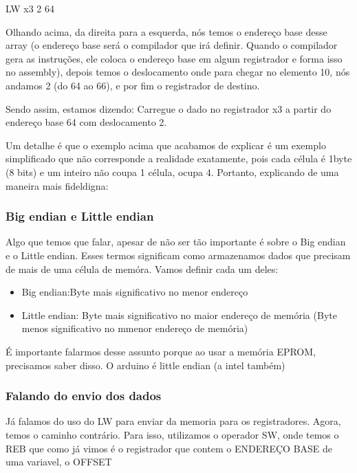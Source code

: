 \documentclass[12pt,a4paper]{report}
\begin{document}
	\begin{center}
		\begin{LARGE}
			LW x3 2 64
		\end{LARGE}
	\end{center}
	
	Olhando acima, da direita para a esquerda, nós temos o endereço base desse array (o endereço base será o compilador que irá definir. Quando o compilador gera as instruções, ele coloca o endereço base em algum registrador e forma isso no assembly), depois temos o deslocamento onde para chegar no elemento 10, nós andamos 2 (do 64 ao 66), e por fim o registrador de destino.
	
	Sendo assim, estamos dizendo: Carregue o dado no registrador x3 a partir do endereço base 64 com deslocamento 2.
	
	Um detalhe é que o exemplo acima que acabamos de explicar é um exemplo simplificado que não corresponde a realidade exatamente, pois cada célula é 1byte (8 bits) e um inteiro não coupa 1 célula, ocupa 4. Portanto, explicando de uma maneira mais fideldigna:
	
	\subsubsection{Big endian e Little endian}
	
	Algo que temos que falar, apesar de não ser tão importante é sobre o Big endian e o Little endian. Esses termos significam como armazenamos dados que precisam de mais de uma célula de memóra. Vamos definir cada um deles:
	
	\begin{itemize}
		\item Big endian:Byte mais significativo no menor endereço 
		\item Little endian: Byte mais significativo no maior endereço de memória (Byte menos significativo no mmenor endereço de memória)
	\end{itemize}
	
	É importante falarmos desse assunto porque ao usar a memória EPROM, precisamos saber disso. O arduino é little endian (a intel também)
	
	\subsubsection{Falando do envio dos dados}
	
	Já falamos do uso do LW para enviar da memoria para os registradores. Agora, temos o caminho contrário. Para isso, utilizamos o operador SW, onde temos o REB que como já vimos é o registrador que contem o ENDEREÇO BASE de uma variavel, o OFFSET 
	
\end{document}
